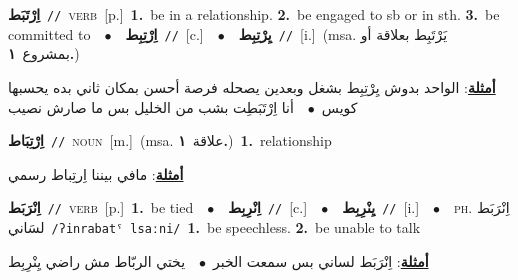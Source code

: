 \documentclass[10pt,a4paper,twoside]{article} %
\begin{document}
\begin{multicols}{2}
{\setlength\topsep{0pt}\textbf{\foreignlanguage{arabic}{اِرْتَبَط}}\ {\color{gray}\texttt{//}\color{black}}\ \textsc{verb}\ [p.]\ \textbf{1.}~be in a relationship.  \textbf{2.}~be engaged to sb or in sth.  \textbf{3.}~be committed to\ \ $\bullet$\ \ \setlength\topsep{0pt}\textbf{\foreignlanguage{arabic}{اِرْتِبِط}}\ {\color{gray}\texttt{//}\color{black}}\ [c.]\ \ $\bullet$\ \ \setlength\topsep{0pt}\textbf{\foreignlanguage{arabic}{يِرْتِبِط}}\ {\color{gray}\texttt{//}\color{black}}\ [i.]\ \color{gray}(msa. \foreignlanguage{arabic}{يَرْتَبِط بعلاقة أو بمشروع}~\foreignlanguage{arabic}{\textbf{١.}})\color{black}\  \begin{flushright}\color{gray}\foreignlanguage{arabic}{\textbf{\underline{\foreignlanguage{arabic}{أمثلة}}}: الواحد بدوش يِرْتِبِط بشغل وبعدين يصحله فرصة أحسن بمكان ثاني بده يحسبها كويس\ $\bullet$\ \  أنا اِرْتَبَطِت بشب من الخليل بس ما صارش نصيب}\end{flushright}\color{black}} \vspace{2mm}

{\setlength\topsep{0pt}\textbf{\foreignlanguage{arabic}{اِرْتِبَاط}}\ {\color{gray}\texttt{//}\color{black}}\ \textsc{noun}\ [m.]\ \color{gray}(msa. \foreignlanguage{arabic}{علاقة}~\foreignlanguage{arabic}{\textbf{١.}})\color{black}\ \textbf{1.}~relationship\  \begin{flushright}\color{gray}\foreignlanguage{arabic}{\textbf{\underline{\foreignlanguage{arabic}{أمثلة}}}: مافي بيننا اِرتِباط رسمي}\end{flushright}\color{black}} \vspace{2mm}

{\setlength\topsep{0pt}\textbf{\foreignlanguage{arabic}{اِنْرَبَط}}\ {\color{gray}\texttt{//}\color{black}}\ \textsc{verb}\ [p.]\ \textbf{1.}~be tied\ \ $\bullet$\ \ \setlength\topsep{0pt}\textbf{\foreignlanguage{arabic}{اِنْرِبِط}}\ {\color{gray}\texttt{//}\color{black}}\ [c.]\ \ $\bullet$\ \ \setlength\topsep{0pt}\textbf{\foreignlanguage{arabic}{يِنْرِبِط}}\ {\color{gray}\texttt{//}\color{black}}\ [i.]\ \ $\bullet$\ \ \textsc{ph.} \color{gray} \foreignlanguage{arabic}{اِنْرَبَط لسَاني}\color{black}\ {\color{gray}\texttt{/{\sffamily ʔinrabatˤ lsaːni}/}\color{black}}\ \textbf{1.}~be speechless.  \textbf{2.}~be unable to talk\  \begin{flushright}\color{gray}\foreignlanguage{arabic}{\textbf{\underline{\foreignlanguage{arabic}{أمثلة}}}: اِنْرَبَط لساني بس سمعت الخبر\ $\bullet$\ \  يختي الربّاط مش راضي يِنْرِبِط}\end{flushright}\color{black}} \vspace{2mm}


\end{multicols}
\end{document}
